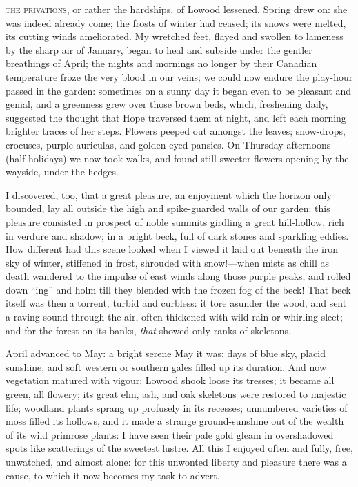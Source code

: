
 \textsc{the privations,} or rather the hardships, of Lowood lessened. Spring
drew on: she was indeed already come; the frosts of winter had ceased;
its snows were melted, its cutting winds ameliorated. My wretched feet,
flayed and swollen to lameness by the sharp air of January, began to
heal and subside under the gentler breathings of April; the nights and
mornings no longer by their Canadian temperature froze the very blood in
our veins; we could now endure the play-hour passed in the garden:
sometimes on a sunny day it began even to be pleasant and genial, and a
greenness grew over those brown beds, which, freshening daily, suggested
the thought that Hope traversed them at night, and left each morning
brighter traces of her steps. Flowers peeped out amongst the leaves;
snow-drops, crocuses, purple auriculas, and golden-eyed pansies. On
Thursday afternoons (half-holidays) we now took walks, and found still
sweeter flowers opening by the wayside, under the hedges.

I discovered, too, that a great pleasure, an enjoyment which the horizon
only bounded, lay all outside the high and spike-guarded walls of our
garden: this pleasure consisted in prospect of noble summits girdling a
great hill-hollow, rich in verdure and shadow; in a bright beck, full of
dark stones and sparkling eddies. How different had this scene looked
when I viewed it laid out beneath the iron sky of winter, stiffened in
frost, shrouded with snow!---when mists as chill as death wandered to
the impulse of east winds along those purple peaks, and rolled down
\enquote{ing} and holm till they blended with the frozen fog of the
beck! That beck itself was then a torrent, turbid and curbless: it tore
asunder the wood, and sent a raving sound through the air, often
thickened with wild rain or whirling sleet; and for the forest on its
banks, \emph{that} showed only ranks of skeletons.

April advanced to May: a bright serene May it was; days of blue sky,
placid sunshine, and soft western or southern gales filled up its
duration. And now vegetation matured with vigour; Lowood shook loose
its tresses; it became all green, all flowery; its great elm, ash, and
oak skeletons were restored to majestic life; woodland plants sprang up
profusely in its recesses; unnumbered varieties of moss filled its
hollows, and it made a strange ground-sunshine out of the wealth of its
wild primrose plants: I have seen their pale gold gleam in overshadowed
spots like scatterings of the sweetest lustre. All this I enjoyed often
and fully, free, unwatched, and almost alone: for this unwonted liberty
and pleasure there was a cause, to which it now becomes my task to
advert.

